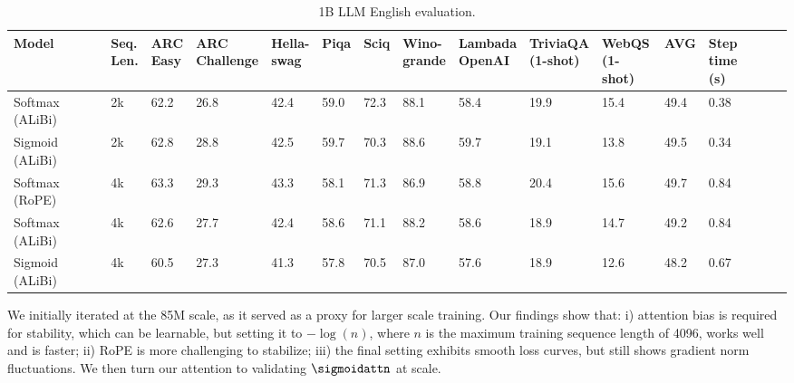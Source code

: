 \begin{table}[t]
\centering
\caption{1B LLM English evaluation.}
\label{tab:lm_results}
\begin{sc}
\begin{scriptsize}
\bgroup
\setlength{\tabcolsep}{.35em}
\begin{tabular}{@{}lllllllllllllll@{}}
\toprule
Model   & \makecell{Seq.\\Len.} & \makecell{ARC\\Easy} & \makecell{ARC\\Challenge} & \makecell{Hella-\\swag} & Piqa & Sciq & \makecell{Wino-\\grande} & \makecell{Lambada\\OpenAI} & \makecell{TriviaQA\\(1-shot)} & \makecell{WebQS\\(1-shot)} & AVG & \makecell{Step\\time (s)} \\ \midrule
Softmax (ALiBi) & 2k & 62.2       &     26.8           &    42.4       &  59.0    &   72.3   &     88.1       &     58.4           &      19.9             &    15.4            &    49.4   & 0.38   \\
Sigmoid (ALiBi) & 2k &  62.8       &      28.8         &    42.5       &  59.7    &   70.3   &     88.6       &      59.7          &       19.1            &   13.8             &       49.5  & 0.34   \\
\midrule
Softmax (RoPE) & 4k & 63.3       &     29.3           &    43.3       &  58.1    &   71.3   &     86.9       &     58.8           &  20.4             &    15.6            &    49.7   & 0.84   \\
Softmax (ALiBi) & 4k & 62.6       &     27.7           &    42.4       &  58.6    &   71.1   &     88.2       &     58.6           &      18.9             &    14.7            &    49.2   & 0.84   \\
Sigmoid (ALiBi) & 4k &  60.5       &      27.3         &    41.3       &  57.8    &   70.5   &     87.0       &      57.6          &       18.9            &   12.6             &       48.2  & 0.67   \\ \bottomrule
\end{tabular}
\egroup
\end{scriptsize}
\end{sc}
\vspace{-0.4cm}
\end{table}

We initially iterated at the 85M scale, as it served as a proxy for larger scale training. Our findings show that: i) attention bias is required for stability, which can be learnable, but setting it to $-\log(n)$, where $n$ is the maximum training sequence length of 4096, works well and is faster; ii) RoPE is more challenging to stabilize; iii) the final setting exhibits smooth loss curves, but still shows gradient norm fluctuations. We then turn our attention to validating $\sigmoidattn$ at scale.

